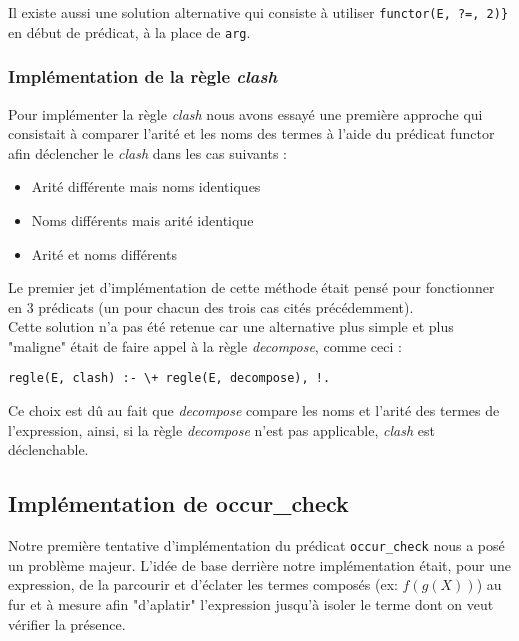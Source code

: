 \documentclass[12pt]{article} %
\begin{document}
Il existe aussi une solution alternative qui consiste à utiliser \verb|functor(E, ?=, 2)}| en début de prédicat, à la place de \verb|arg|.

\subsubsection*{Implémentation de la règle \textit{clash}}

Pour implémenter la règle \textit{clash} nous avons essayé une première approche qui consistait à comparer l'arité et les noms des termes à l'aide du prédicat functor afin déclencher le \textit{clash} dans les cas suivants :

\begin{itemize}
	\item Arité différente mais noms identiques
	\item Noms différents mais arité identique
	\item Arité et noms différents\\
\end{itemize}

Le premier jet d'implémentation de cette méthode était pensé pour fonctionner en 3 prédicats (un pour chacun des trois cas cités précédemment).\\

Cette solution n'a pas été retenue car une alternative plus simple et plus "maligne" était de faire appel à la règle \textit{decompose}, comme ceci :

\begin{center}
	\verb|regle(E, clash) :- \+ regle(E, decompose), !.|
\end{center}

Ce choix est dû au fait que \textit{decompose} compare les noms et l'arité des termes de l'expression, ainsi, si la règle \textit{decompose} n'est pas applicable, \textit{clash} est déclenchable.

\subsection*{Implémentation de occur\_check}

Notre première tentative d'implémentation du prédicat \verb|occur_check| nous a posé un problème majeur. L'idée de base derrière notre implémentation était, pour une expression, de la parcourir et d'éclater les termes composés (ex: $f(g(X))$) au fur et à mesure afin "d'aplatir" l'expression jusqu'à isoler le terme dont on veut vérifier la présence.\\
\end{document}
